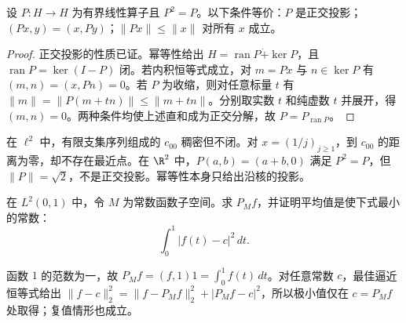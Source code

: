 \begin{proposition}[从算子识别正交投影]\label{prop:y3-contracting-projection}
设 $P:H\to H$ 为有界线性算子且 $P^2=P$。以下条件等价：$P$ 是正交投影；$(Px,y)=(x,Py)$；$\|Px\|\le\|x\|$ 对所有 $x$ 成立。
\end{proposition}
\begin{proof}
正交投影的性质已证。幂等性给出 $H=\operatorname{ran}P\mathbin{\dot+}\ker P$，且 $\operatorname{ran}P=\ker(I-P)$ 闭。若内积恒等式成立，对 $m=Px$ 与 $n\in\ker P$ 有 $(m,n)=(x,Pn)=0$。若 $P$ 为收缩，则对任意标量 $t$ 有 $\|m\|=\|P(m+tn)\|\le\|m+tn\|$。分别取实数 $t$ 和纯虚数 $t$ 并展开，得 $(m,n)=0$。两种条件均使上述直和成为正交分解，故 $P=P_{\operatorname{ran}P}$。
\end{proof}

\begin{example}[闭性不能省略]
在 $\ell^2$ 中，有限支集序列组成的 $c_{00}$ 稠密但不闭。对 $x=(1/j)_{j\ge1}$，到 $c_{00}$ 的距离为零，却不存在最近点。在 $\R^2$ 中，$P(a,b)=(a+b,0)$ 满足 $P^2=P$，但 $\|P\|=\sqrt2$，不是正交投影。幂等性本身只给出沿核的投影。
\end{example}

\begin{exercise}
在 $L^2(0,1)$ 中，令 $M$ 为常数函数子空间。求 $P_Mf$，并证明平均值是使下式最小的常数：
\[
 \int_0^1|f(t)-c|^2\,dt.
\]
\end{exercise}
\begin{solution}
函数 $1$ 的范数为一，故 $P_Mf=(f,1)1=\int_0^1f(t)\,dt$。对任意常数 $c$，最佳逼近恒等式给出
$\|f-c\|_2^2=\|f-P_Mf\|_2^2+|P_Mf-c|^2$，所以极小值仅在 $c=P_Mf$ 处取得；复值情形也成立。
\end{solution}
